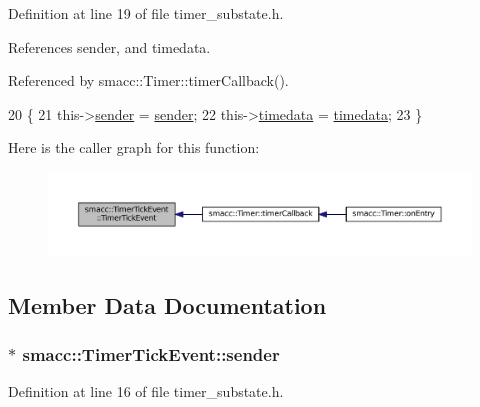 Definition at line 19 of file timer\+\_\+substate.\+h.



References sender, and timedata.



Referenced by smacc\+::\+Timer\+::timer\+Callback().


\begin{DoxyCode}
20   \{
21     this->\hyperlink{structsmacc_1_1TimerTickEvent_adeac356195d07acbee0ec2e02bf2d500}{sender} = \hyperlink{structsmacc_1_1TimerTickEvent_adeac356195d07acbee0ec2e02bf2d500}{sender};
22     this->\hyperlink{structsmacc_1_1TimerTickEvent_afac83d8b00999b26c2365932030389e9}{timedata} = \hyperlink{structsmacc_1_1TimerTickEvent_afac83d8b00999b26c2365932030389e9}{timedata};
23   \}
\end{DoxyCode}


Here is the caller graph for this function\+:
\nopagebreak
\begin{figure}[H]
\begin{center}
\leavevmode
\includegraphics[width=350pt]{structsmacc_1_1TimerTickEvent_aa41996c36a5cad4b74ea5ca09c187943_icgraph}
\end{center}
\end{figure}




\subsection{Member Data Documentation}
\subsubsection[{\texorpdfstring{sender}{sender}}]{$\ast$ smacc\+::\+Timer\+Tick\+Event\+::sender}\hypertarget{structsmacc_1_1TimerTickEvent_adeac356195d07acbee0ec2e02bf2d500}{}\label{structsmacc_1_1TimerTickEvent_adeac356195d07acbee0ec2e02bf2d500}


Definition at line 16 of file timer\+\_\+substate.\+h.



